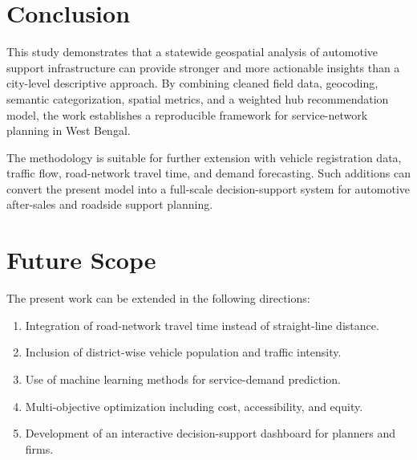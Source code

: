 \section{Conclusion}

This study demonstrates that a statewide geospatial analysis of automotive support infrastructure can provide stronger and more actionable insights than a city-level descriptive approach. By combining cleaned field data, geocoding, semantic categorization, spatial metrics, and a weighted hub recommendation model, the work establishes a reproducible framework for service-network planning in West Bengal.

The methodology is suitable for further extension with vehicle registration data, traffic flow, road-network travel time, and demand forecasting. Such additions can convert the present model into a full-scale decision-support system for automotive after-sales and roadside support planning.

\section{Future Scope}

The present work can be extended in the following directions:
\begin{enumerate}
    \item Integration of road-network travel time instead of straight-line distance.
    \item Inclusion of district-wise vehicle population and traffic intensity.
    \item Use of machine learning methods for service-demand prediction.
    \item Multi-objective optimization including cost, accessibility, and equity.
    \item Development of an interactive decision-support dashboard for planners and firms.
\end{enumerate}
